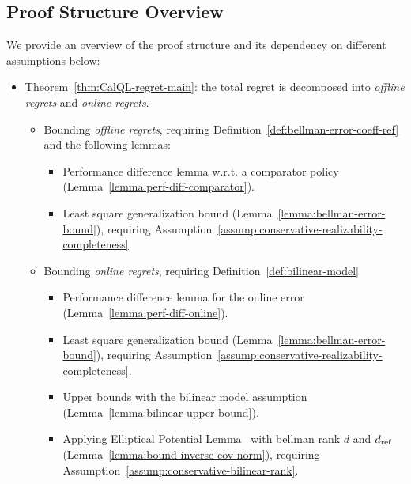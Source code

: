 \vspace{-0.2cm}
\subsection{Proof Structure Overview}
\vspace{-0.2cm}
We provide an overview of the proof structure and its dependency on different assumptions below:
\begin{itemize}
    \item Theorem~\ref{thm:CalQL-regret-main}: the total regret is decomposed into {\em offline regrets} and {\em online regrets}.
    \begin{itemize}
        \item Bounding {\em offline regrets}, requiring Definition~\ref{def:bellman-error-coeff-ref} and the following lemmas:
        \begin{itemize}
            \item Performance difference lemma w.r.t. a comparator policy (Lemma~\ref{lemma:perf-diff-comparator}).
            \item Least square generalization bound (Lemma~\ref{lemma:bellman-error-bound}), requiring Assumption~\ref{assump:conservative-realizability-completeness}.
        \end{itemize}
        \item Bounding {\em online regrets}, requiring Definition~\ref{def:bilinear-model}
        \begin{itemize}
            \item Performance difference lemma for the online error (Lemma~\ref{lemma:perf-diff-online}).
            \item Least square generalization bound (Lemma~\ref{lemma:bellman-error-bound}), requiring Assumption~\ref{assump:conservative-realizability-completeness}.
            \item Upper bounds with the bilinear model assumption (Lemma~\ref{lemma:bilinear-upper-bound}).
            \item Applying Elliptical Potential Lemma~\cite{lattimore2020bandit} with bellman rank $d$ and $d_\mathrm{ref}$ (Lemma~\ref{lemma:bound-inverse-cov-norm}), requiring Assumption~\ref{assump:conservative-bilinear-rank}.
        \end{itemize}
    \end{itemize}
\end{itemize}

